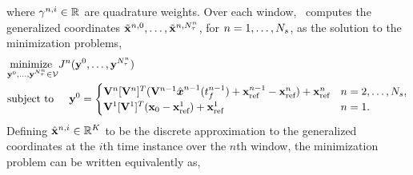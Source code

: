 where $\gamma^{n,i} \in \mathbb{R}^{}$ are quadrature weights. 
Over each window, \methodAcronym\ computes the generalized coordinates $\tilde{\mathbf{x}}^{n,0},\ldots,\tilde{\mathbf{x}}^{n,N_{\tau}^{n}}$, for $n=1,\ldots,N_s$, as the solution to the minimization problems,
\begin{align*}
&\underset{\mathbf{y}^{0},\ldots,\mathbf{y}^{N_{\tau}^{n}} \in \mathcal{V }}{\text{minimize } }
J_{}^{n} (\mathbf{y}^{0},\ldots,\mathbf{y}^{N_{\tau}^{n}}) \\
& \text{subject to} \hspace{0.2 in}  \mathbf{y}^{0} =
\begin{cases} \mathbf {V}^{n} [\mathbf {V}^{n}]^T(\mathbf {V}^{n-1} \hat{ \boldsymbol x}^{n-1}(t_f^{n-1} ) + \mathbf{x}_\text{ref}^{n-1} - \mathbf{x}_\text{ref}^{n} ) + \mathbf{x}_\text{ref}^{n}& n = 2,\ldots,N_s,\\
\mathbf {V}^{1} [\mathbf {V}^{1}]^T( {{\mathbf{x}}_0} - \mathbf{x}_\text{ref}^{1})  + \mathbf{x}_\text{ref}^{1}& n=1. \end{cases} \end{align*}
Defining $\hat{\mathbf{x}}^{n,i} \in \mathbb{R}^{K}$ to be the discrete approximation to the generalized coordinates at the $i$th time instance over the $n$th window, 
the minimization problem can be written equivalently as,
